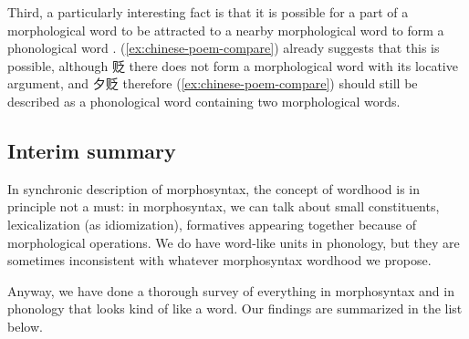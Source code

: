 \documentclass[a4paper, oneside, scheme=plain, 12pt]{article}
\newcommand*{\citepage}[1]{p.~{#1}}
\begin{document}
Third, a particularly interesting fact is that it is possible for a part of a morphological word
to be attracted to a nearby morphological word to form a phonological word
\citep[\citepage{24}]{dixon2010basic2}.
(\ref{ex:chinese-poem-compare}) already suggests that this is possible,
although 贬 there does not form a morphological word with its locative argument,
and 夕贬 therefore (\ref{ex:chinese-poem-compare}) should still be described as
a phonological word containing two morphological words.

\subsection{Interim summary}\label{sec:all-wordhood}

In synchronic description of morphosyntax,
the concept of wordhood is in principle not a must:
in morphosyntax, we can talk about small constituents, lexicalization (as idiomization),
formatives appearing together because of morphological operations.
We do have word-like units in phonology,
but they are sometimes inconsistent with whatever morphosyntax wordhood we propose.

Anyway, we have done a thorough survey of everything in morphosyntax and in phonology that looks kind of like a word. 
Our findings are summarized in the list below.
\end{document}
